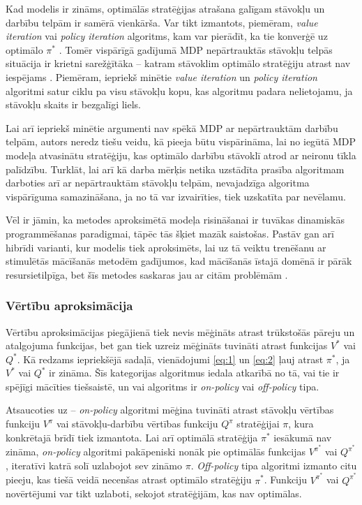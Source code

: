 \documentclass{ludis} %
\begin{document}
Kad modelis ir zināms, optimālās stratēģijas atrašana galīgam stāvokļu un
darbību telpām ir samērā vienkārša. Var tikt izmantots, piemēram, \textit{value
  iteration} vai \textit{policy iteration} algoritms, kam var pierādīt, ka
tie konverģē uz optimālo $\pi^*$ \autocite{Barto}. Tomēr vispārīgā gadījumā MDP
nepārtrauktās stāvokļu telpās situācija ir krietni sarežģītāka -- katram
stāvoklim optimālo stratēģiju atrast nav iespējams \autocite{Otterlo}. Piemēram,
iepriekš minētie \textit{value iteration} un \textit{policy iteration} algoritmi
satur ciklu pa visu stāvokļu kopu, kas algoritmu padara nelietojamu, ja stāvokļu
skaits ir bezgalīgi liels.


Lai arī iepriekš minētie argumenti nav spēkā MDP ar nepārtrauktām darbību
telpām, autors neredz tiešu veidu, kā pieeja būtu vispārināma, lai no iegūtā MDP
modeļa atvasinātu stratēģiju, kas optimālo darbību stāvoklī atrod ar neironu
tīkla palīdzību.
Turklāt, lai arī kā darba mērķis netika uzstādīta prasība algoritmam darboties
arī ar nepārtrauktām stāvokļu telpām, nevajadzīga algoritma vispārīguma
samazināšana, ja no tā var izvairīties, tiek uzskatīta par nevēlamu.

Vēl ir jāmin, ka metodes aproksimētā modeļa risināšanai ir tuvākas dinamiskās
programmēšanas paradigmai, tāpēc tās šķiet mazāk saistošas. Pastāv gan arī
hibrīdi varianti, kur modelis tiek aproksimēts, lai uz tā veiktu trenēšanu ar
stimulētās mācīšanās metodēm gadījumos, kad mācīšanās īstajā domēnā ir pārāk
resursietilpīga, bet šīs metodes saskaras jau ar citām problēmām
\autocite{Hasselt2012}.

\subsubsection{Vērtību aproksimācija}
Vērtību aproksimācijas piegājienā tiek nevis mēģināts atrast trūkstošās pāreju
un atalgojuma funkcijas, bet gan tiek uzreiz mēģināts tuvināti atrast funkcijas
$V^*$ vai $Q^*$. Kā redzams iepriekšējā sadaļā, vienādojumi \eqref{eq:1} un
\eqref{eq:2} ļauj atrast $\pi^*$, ja $V^*$ vai $Q^*$ ir zināma. Šīs kategorijas
algoritmus iedala atkarībā no tā, vai tie ir spējīgi mācīties tiešsaistē, un vai
algoritms ir \textit{on-policy} vai \textit{off-policy} tipa.

Atsaucoties uz \autocite{Hasselt2012} -- \textit{on-policy} algoritmi mēģina
tuvināti atrast stāvokļu vērtības funkciju $V^\pi$ vai stāvokļu-darbību vērtības
funkciju $Q^\pi$ stratēģijai $\pi$, kura konkrētajā brīdī tiek izmantota. Lai
arī optimālā stratēģija $\pi^*$ iesākumā nav zināma, \textit{on-policy}
algoritmi pakāpeniski nonāk pie optimālās funkcijas $V^{\pi^*}$ vai $Q^{\pi^*}$,
iteratīvi katrā solī uzlabojot sev zināmo $\pi$. \textit{Off-policy} tipa
algoritmi izmanto citu pieeju, kas tiešā veidā necenšas atrast optimālo
stratēģiju $\pi^*$. Funkciju $V^{\pi^*}$ vai $Q^{\pi^*}$ novērtējumi var tikt
uzlaboti, sekojot stratēģijām, kas nav optimālas.
\end{document}

